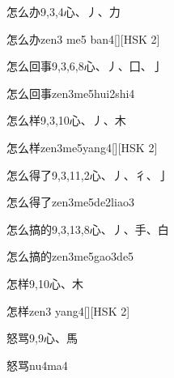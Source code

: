 \begin{entry}{怎么办}{9,3,4}{⼼、⼃、⼒}
  \begin{phonetics}{怎么办}{zen3 me5 ban4}[][HSK 2]
  \end{phonetics}
\end{entry}

\begin{entry}{怎么回事}{9,3,6,8}{⼼、⼃、⼞、⼅}
  \begin{phonetics}{怎么回事}{zen3me5hui2shi4}
  \end{phonetics}
\end{entry}

\begin{entry}{怎么样}{9,3,10}{⼼、⼃、⽊}
  \begin{phonetics}{怎么样}{zen3me5yang4}[][HSK 2]
  \end{phonetics}
\end{entry}

\begin{entry}{怎么得了}{9,3,11,2}{⼼、⼃、⼻、⼅}
  \begin{phonetics}{怎么得了}{zen3me5de2liao3}
  \end{phonetics}
\end{entry}

\begin{entry}{怎么搞的}{9,3,13,8}{⼼、⼃、⼿、⽩}
  \begin{phonetics}{怎么搞的}{zen3me5gao3de5}
  \end{phonetics}
\end{entry}

\begin{entry}{怎样}{9,10}{⼼、⽊}
  \begin{phonetics}{怎样}{zen3 yang4}[][HSK 2]
  \end{phonetics}
\end{entry}

\begin{entry}{怒骂}{9,9}{⼼、⾺}
  \begin{phonetics}{怒骂}{nu4ma4}
  \end{phonetics}
\end{entry}

